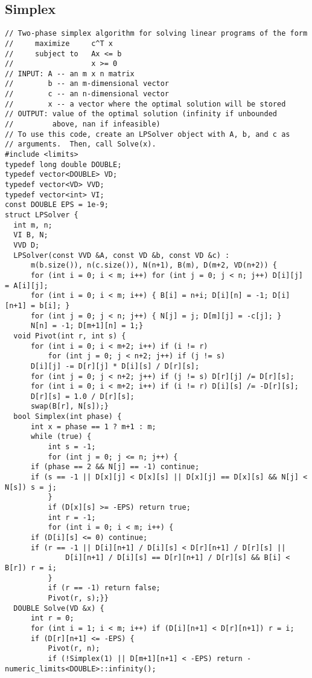 \documentclass[8pt, oneside]{extarticle}
\begin{document}
\begin{multicols}{3}
\subsection{Simplex}
\begin{lstlisting}
// Two-phase simplex algorithm for solving linear programs of the form
//     maximize     c^T x
//     subject to   Ax <= b
//                  x >= 0
// INPUT: A -- an m x n matrix
//        b -- an m-dimensional vector
//        c -- an n-dimensional vector
//        x -- a vector where the optimal solution will be stored
// OUTPUT: value of the optimal solution (infinity if unbounded
//         above, nan if infeasible)
// To use this code, create an LPSolver object with A, b, and c as
// arguments.  Then, call Solve(x).
#include <limits>
typedef long double DOUBLE;
typedef vector<DOUBLE> VD;
typedef vector<VD> VVD;
typedef vector<int> VI;
const DOUBLE EPS = 1e-9;
struct LPSolver {
  int m, n;
  VI B, N;
  VVD D;
  LPSolver(const VVD &A, const VD &b, const VD &c) : 
      m(b.size()), n(c.size()), N(n+1), B(m), D(m+2, VD(n+2)) {
      for (int i = 0; i < m; i++) for (int j = 0; j < n; j++) D[i][j] = A[i][j];
      for (int i = 0; i < m; i++) { B[i] = n+i; D[i][n] = -1; D[i][n+1] = b[i]; }
      for (int j = 0; j < n; j++) { N[j] = j; D[m][j] = -c[j]; }
      N[n] = -1; D[m+1][n] = 1;}
  void Pivot(int r, int s) {
      for (int i = 0; i < m+2; i++) if (i != r)
          for (int j = 0; j < n+2; j++) if (j != s)
      D[i][j] -= D[r][j] * D[i][s] / D[r][s];
      for (int j = 0; j < n+2; j++) if (j != s) D[r][j] /= D[r][s];
      for (int i = 0; i < m+2; i++) if (i != r) D[i][s] /= -D[r][s];
      D[r][s] = 1.0 / D[r][s];
      swap(B[r], N[s]);}
  bool Simplex(int phase) {
      int x = phase == 1 ? m+1 : m;
      while (true) {
          int s = -1;
          for (int j = 0; j <= n; j++) {
      if (phase == 2 && N[j] == -1) continue;
      if (s == -1 || D[x][j] < D[x][s] || D[x][j] == D[x][s] && N[j] < N[s]) s = j;
          }
          if (D[x][s] >= -EPS) return true;
          int r = -1;
          for (int i = 0; i < m; i++) {
      if (D[i][s] <= 0) continue;
      if (r == -1 || D[i][n+1] / D[i][s] < D[r][n+1] / D[r][s] ||
              D[i][n+1] / D[i][s] == D[r][n+1] / D[r][s] && B[i] < B[r]) r = i;
          }
          if (r == -1) return false;
          Pivot(r, s);}}
  DOUBLE Solve(VD &x) {
      int r = 0;
      for (int i = 1; i < m; i++) if (D[i][n+1] < D[r][n+1]) r = i;
      if (D[r][n+1] <= -EPS) {
          Pivot(r, n);
          if (!Simplex(1) || D[m+1][n+1] < -EPS) return -numeric_limits<DOUBLE>::infinity();

\end{lstlisting}
\end{multicols}
\end{document}
